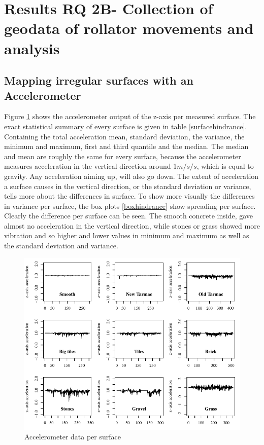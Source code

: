 \clearpage

\section{Results RQ 2B- Collection of geodata of rollator movements and analysis}
\subsection{Mapping irregular surfaces with an Accelerometer}
Figure \ref{figsurfaces} shows the accelerometer output of the z-axis per measured surface. The exact statistical summary of every surface is given in table \ref{surfacehindrance}. Containing the total acceleration mean, standard deviation, the variance, the minimum and maximum, first and third quantile and the median. The median and mean are roughly the same for every surface, because the accelerometer measures acceleration in the vertical direction around 1$m/s/s$, which is equal to gravity. Any acceleration aiming up, will also go down. The extent of acceleration a surface causes in the vertical direction, or the standard deviation or variance, tells more about the differences in surface.
To show more visually the differences in variance per surface, the box plots \ref{boxhindrance} show spreading per surface. Clearly the difference per surface can be seen. The smooth concrete inside, gave almost no acceleration in the vertical direction, while stones or grass showed more vibration and so higher and lower values in minimum and maximum as well as the standard deviation and variance.   

\begin{figure}[H]
\includegraphics[width=\textwidth]{img/R_AllsurfaceGraphs.pdf}
\centering
\caption[Accelerometer data per surface]{
Accelerometer data per surface\label{figsurfaces}}
\end{figure} 

